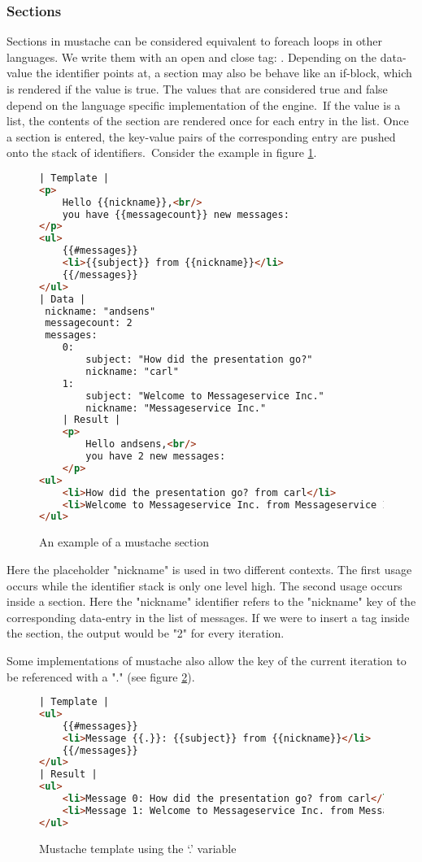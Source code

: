 \subsubsection{Sections}
Sections in mustache can be considered equivalent to foreach loops in other
languages. We write them with an open and close tag:
.
Depending on the data-value the identifier points at, a section may also be
behave like an if-block, which is rendered if the value is true. The values that
are considered true and false depend on the language specific implementation
of the engine.\
If the value is a list, the contents of the section are rendered once for each
entry in the list. Once a section is entered, the key-value pairs of the
corresponding entry are pushed onto the stack of identifiers.\
Consider the example in figure \ref{fig:section.mustache}.
\begin{figure}
	\centering
	\caption{An example of a mustache section}
	\label{fig:section.mustache}
	\begin{lstlisting}[language=HTML]
| Template |
<p>
	Hello {{nickname}},<br/>
	you have {{messagecount}} new messages:
</p>
<ul>
	{{#messages}}
	<li>{{subject}} from {{nickname}}</li>
	{{/messages}}
</ul>
| Data |
 nickname: "andsens"
 messagecount: 2
 messages:
 	0:
 		subject: "How did the presentation go?"
 		nickname: "carl"
 	1:
 		subject: "Welcome to Messageservice Inc."
 		nickname: "Messageservice Inc."
	| Result |
	<p>
		Hello andsens,<br/>
		you have 2 new messages:
	</p>
<ul>
	<li>How did the presentation go? from carl</li>
	<li>Welcome to Messageservice Inc. from Messageservice Inc.</li>
</ul>
	\end{lstlisting}
\end{figure}
Here the placeholder "nickname" is used in two different contexts.
The first usage occurs while the identifier stack is only one level high.
The second usage occurs inside a section. Here the "nickname" identifier refers
to the "nickname" key of the corresponding data-entry in the list of messages.
If we were to insert a \inline{\{\{messagecount\}\}} tag inside the section,
the output would be "2" for every iteration.

Some implementations of mustache also allow the key of the current iteration to
be referenced with a "." (see figure \ref{fig:dot-oper.mustache}).
\begin{figure}
	\centering
	\caption{Mustache template using the `.' variable}
	\label{fig:dot-oper.mustache}
	\begin{lstlisting}[language=HTML]
| Template |
<ul>
	{{#messages}}
	<li>Message {{.}}: {{subject}} from {{nickname}}</li>
	{{/messages}}
</ul>
| Result |
<ul>
	<li>Message 0: How did the presentation go? from carl</li>
	<li>Message 1: Welcome to Messageservice Inc. from Messageservice Inc.</li>
</ul>
	\end{lstlisting}
\end{figure}

